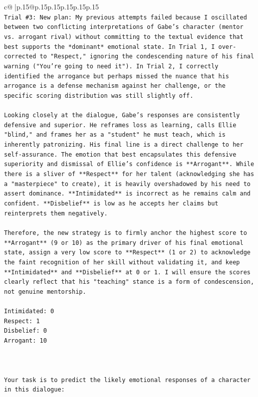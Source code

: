\documentclass{article}
\begin{document}
{\begin{supertabular}{c@{$\;$}|p{.15\linewidth}@{}p{.15\linewidth}p{.15\linewidth}p{.15\linewidth}p{.15\linewidth}p{.15\linewidth}}
{{{\\ 
\texttt{Trial \#3: New plan: My previous attempts failed because I oscillated between two conflicting interpretations of Gabe's character (mentor vs. arrogant rival) without committing to the textual evidence that best supports the *dominant* emotional state. In Trial 1, I over{-}corrected to "Respect," ignoring the condescending nature of his final warning ("You're going to need it"). In Trial 2, I correctly identified the arrogance but perhaps missed the nuance that his arrogance is a defense mechanism against her challenge, or the specific scoring distribution was still slightly off.} \\
\\ 
\texttt{Looking closely at the dialogue, Gabe's responses are consistently defensive and superior. He reframes loss as learning, calls Ellie "blind," and frames her as a "student" he must teach, which is inherently patronizing. His final line is a direct challenge to her self{-}assurance. The emotion that best encapsulates this defensive superiority and dismissal of Ellie's confidence is **Arrogant**. While there is a sliver of **Respect** for her talent (acknowledging she has a "masterpiece" to create), it is heavily overshadowed by his need to assert dominance. **Intimidated** is incorrect as he remains calm and confident. **Disbelief** is low as he accepts her claims but reinterprets them negatively.} \\
\\ 
\texttt{Therefore, the new strategy is to firmly anchor the highest score to **Arrogant** (9 or 10) as the primary driver of his final emotional state, assign a very low score to **Respect** (1 or 2) to acknowledge the faint recognition of her skill without validating it, and keep **Intimidated** and **Disbelief** at 0 or 1. I will ensure the scores clearly reflect that his "teaching" stance is a form of condescension, not genuine mentorship.} \\
\\ 
\texttt{Intimidated: 0} \\
\texttt{Respect: 1} \\
\texttt{Disbelief: 0} \\
\texttt{Arrogant: 10} \\
\\ 
\\ 
\\ 
\texttt{Your task is to predict the likely emotional responses of a character in this dialogue:} \\
\\ 
}}}
\end{supertabular}}
\end{document}
